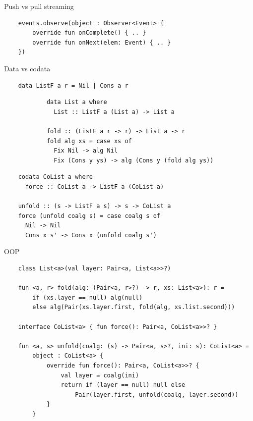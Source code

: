 
    \begin{frame}[fragile]{Push vs pull streaming}
        \pause
        \begin{verbatim}
    events.observe(object : Observer<Event> {
        override fun onComplete() { .. }
        override fun onNext(elem: Event) { .. }
    })
        \end{verbatim}
    \end{frame}

    \begin{frame}[fragile]{Data vs codata}
        \pause
        \begin{verbatim}
    data ListF a r = Nil | Cons a r
        \end{verbatim}
        \pause\vspace{1em}
        \begin{verbatim}
            data List a where
              List :: ListF a (List a) -> List a

            fold :: (ListF a r -> r) -> List a -> r
            fold alg xs = case xs of
              Fix Nil -> alg Nil
              Fix (Cons y ys) -> alg (Cons y (fold alg ys))
        \end{verbatim}
        \pause\vspace{1em}
        \begin{verbatim}
    codata CoList a where
      force :: CoList a -> ListF a (CoList a)

    unfold :: (s -> ListF a s) -> s -> CoList a
    force (unfold coalg s) = case coalg s of
      Nil -> Nil
      Cons x s' -> Cons x (unfold coalg s')
        \end{verbatim}
    \end{frame}

    \begin{frame}[fragile]{OOP}
        \pause
        \begin{verbatim}
    class List<a>(val layer: Pair<a, List<a>>?)

    fun <a, r> fold(alg: (Pair<a, r>?) -> r, xs: List<a>): r =
        if (xs.layer == null) alg(null)
        else alg(Pair(xs.layer.first, fold(alg, xs.list.second)))

    interface CoList<a> { fun force(): Pair<a, CoList<a>>? }

    fun <a, s> unfold(coalg: (s) -> Pair<a, s>?, ini: s): CoList<a> =
        object : CoList<a> {
            override fun force(): Pair<a, CoList<a>>? {
                val layer = coalg(ini)
                return if (layer == null) null else
                    Pair(layer.first, unfold(coalg, layer.second))
            }
        }
        \end{verbatim}
    \end{frame}


